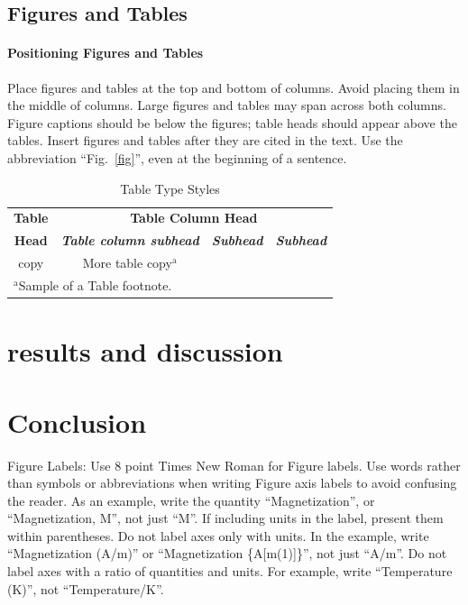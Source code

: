 \documentclass[conference]{IEEEtran}
\begin{document}
\subsection{Figures and Tables}\label{FAT}
\paragraph{Positioning Figures and Tables} Place figures and tables at the top and 
bottom of columns. Avoid placing them in the middle of columns. Large 
figures and tables may span across both columns. Figure captions should be 
below the figures; table heads should appear above the tables. Insert 
figures and tables after they are cited in the text. Use the abbreviation 
``Fig.~\ref{fig}'', even at the beginning of a sentence.

\begin{table}[htbp]
\caption{Table Type Styles}
\begin{center}
\begin{tabular}{|c|c|c|c|}
\hline
\textbf{Table}&\multicolumn{3}{|c|}{\textbf{Table Column Head}} \\
\cline{2-4} 
\textbf{Head} & \textbf{\textit{Table column subhead}}& \textbf{\textit{Subhead}}& \textbf{\textit{Subhead}} \\
\hline
copy& More table copy$^{\mathrm{a}}$& &  \\
\hline
\multicolumn{4}{l}{$^{\mathrm{a}}$Sample of a Table footnote.}
\end{tabular}
\label{tab1}
\end{center}
\end{table}

\section{results and discussion}

\section{Conclusion}

Figure Labels: Use 8 point Times New Roman for Figure labels. Use words 
rather than symbols or abbreviations when writing Figure axis labels to 
avoid confusing the reader. As an example, write the quantity 
``Magnetization'', or ``Magnetization, M'', not just ``M''. If including 
units in the label, present them within parentheses. Do not label axes only 
with units. In the example, write ``Magnetization (A/m)'' or ``Magnetization 
\{A[m(1)]\}'', not just ``A/m''. Do not label axes with a ratio of 
quantities and units. For example, write ``Temperature (K)'', not 
``Temperature/K''.
\end{document}
